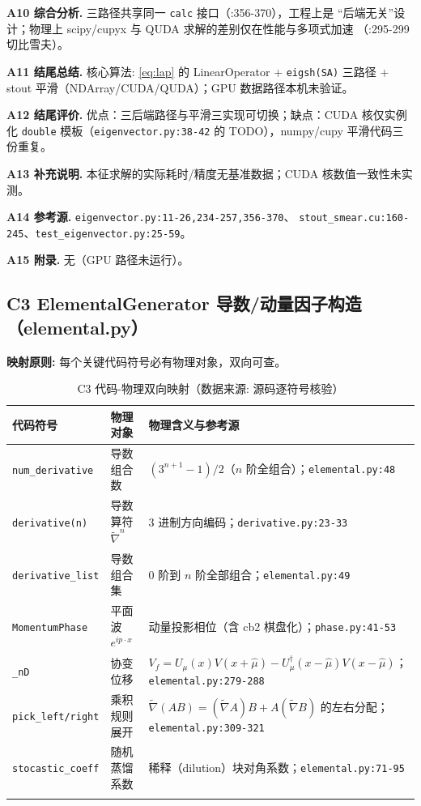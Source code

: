 \documentclass[UTF8]{ctexart}
\begin{document}
\textbf{A10 综合分析.} 三路径共享同一 \texttt{calc} 接口（:356-370），工程上是
``后端无关''设计；物理上 scipy/cupyx 与 QUDA 求解的差别仅在性能与多项式加速
（:295-299 切比雪夫）。

\textbf{A11 结尾总结.} \textcolor{algo}{核心算法:} \eqref{eq:lap} 的 LinearOperator +
\texttt{eigsh(SA)} 三路径 + stout 平滑（NDArray/CUDA/QUDA）；GPU 数据路径本机\textcolor{warn}{未验证}。

\textbf{A12 结尾评价.} 优点：三后端路径与平滑三实现可切换；缺点：CUDA 核仅实例化
\texttt{double} 模板（\texttt{\nolinkurl{eigenvector.py:38-42}} 的 TODO），numpy/cupy 平滑代码三份重复。

\textbf{A13 补充说明.} 本征求解的实际耗时/精度无基准数据；CUDA 核数值一致性未实测。

\textbf{A14 参考源.} \texttt{\nolinkurl{eigenvector.py:11-26,234-257,356-370}}、
\texttt{\nolinkurl{stout_smear.cu:160-245}}、\texttt{\nolinkurl{test_eigenvector.py:25-59}}。

\textbf{A15 附录.} 无（GPU 路径未运行）。

\subsection{C3 ElementalGenerator 导数/动量因子构造（elemental.py）}

\begin{mapbox}
\textbf{映射原则:} 每个关键代码符号必有物理对象，双向可查。
\end{mapbox}

{\footnotesize\begin{xltabular}{\textwidth}{XlX}
\toprule
\textcolor{map}{代码符号} & 物理对象 & 物理含义与参考源 \\
\midrule
\endhead
\texttt{\nolinkurl{num_derivative}} & 导数组合数 & $(3^{n+1}-1)/2$（$n$ 阶全组合）；\texttt{\nolinkurl{elemental.py:48}} \\
\texttt{derivative(n)} & 导数算符 $\tilde\nabla^n$ & 3 进制方向编码；\texttt{\nolinkurl{derivative.py:23-33}} \\
\texttt{\nolinkurl{derivative_list}} & 导数组合集 & 0 阶到 $n$ 阶全部组合；\texttt{\nolinkurl{elemental.py:49}} \\
\texttt{MomentumPhase} & 平面波 $e^{ip\cdot x}$ & 动量投影相位（含 cb2 棋盘化）；\texttt{\nolinkurl{phase.py:41-53}} \\
\texttt{\nolinkurl{_nD}} & 协变位移 & $V_f=U_\mu(x)V(x+\hat\mu)-U^\dagger_\mu(x-\hat\mu)V(x-\hat\mu)$；\texttt{\nolinkurl{elemental.py:279-288}} \\
\texttt{\nolinkurl{pick_left/right}} & 乘积规则展开 & $\tilde\nabla(AB)=(\tilde\nabla A)B+A(\tilde\nabla B)$ 的左右分配；\texttt{\nolinkurl{elemental.py:309-321}} \\
\texttt{\nolinkurl{stocastic_coeff}} & 随机蒸馏系数 & 稀释（dilution）块对角系数；\texttt{\nolinkurl{elemental.py:71-95}} \\
\bottomrule
\caption{C3 代码-物理双向映射（数据来源: 源码逐符号核验）}
\end{xltabular}}
\end{document}
